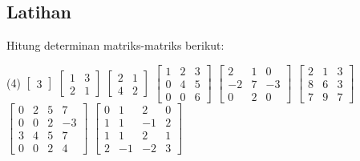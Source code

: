\subsection{Latihan}

\begin{exercise}
Hitung determinan matriks-matriks berikut:
\begin{tasks}(4)
\task
$\begin{bmatrix}
3
\end{bmatrix}$
\task
$\begin{bmatrix}
1 & 3 \\
2 & 1
\end{bmatrix}$
\task
$\begin{bmatrix}
2 & 1 \\
4 & 2
\end{bmatrix}$
\task
$\begin{bmatrix}
1 & 2 & 3 \\
0 & 4 & 5 \\
0 & 0 & 6
\end{bmatrix}$
\task
$\begin{bmatrix}
2 & 1 & 0 \\
-2 & 7 & -3 \\
0 & 2 & 0
\end{bmatrix}$
\task
$\begin{bmatrix}
2 & 1 & 3 \\
8 & 6 & 3 \\
7 & 9 & 7
\end{bmatrix}$
\task
$\begin{bmatrix}
0 & 2 & 5 & 7 \\
0 & 0 & 2 & -3 \\
3 & 4 & 5 & 7 \\
0 & 0 & 2 & 4
\end{bmatrix}$
\task
$\begin{bmatrix}
0 &  1 &  2 &  0 \\
1 &  1 & -1 & 2 \\
1 &  1 &  2 & 1 \\
2 & -1 & -2 & 3
\end{bmatrix}$
\end{tasks}
\end{exercise}

